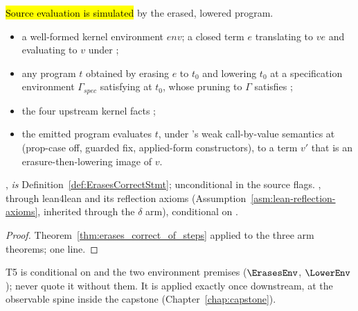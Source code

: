 \begin{theorem}
\label{thm:erases_correct}
\leanok
{}
 \hl{Source evaluation is simulated} by the erased, lowered \lbox{} program.
\begin{itemize}
\item {} a well-formed kernel environment $env$; a closed term $e$ translating to $ve$ and
evaluating to $v$ under \SEval{};
\item any \lbox{} program $t$ obtained by erasing $e$ to $t_0$ and lowering $t_0$ at a specification
environment $\Gamma_{spec}$ satisfying \ErasesEnv{} at $t_0$, whose pruning to $\Gamma$ satisfies
\LowerEnv{};
\item the four upstream kernel facts ;
\item {} the emitted program evaluates $t$, under \lbox{}'s weak call-by-value semantics at
 (prop-case off, guarded fix, applied-form constructors), to a term $v'$ that is an
erasure-then-lowering image of $v$.
\end{itemize}
 , \emph{is} Definition~\ref{def:ErasesCorrectStmt}; unconditional in
the source flags.
 \stProved{}, \stInherited{} through lean4lean and its reflection axioms
(Assumption~\ref{asm:lean-reflection-axioms}, inherited through the $\delta$ arm), conditional on
\stAssumed{} .
\end{theorem}
\begin{proof}
\leanok
{}
 Theorem~\ref{thm:erases_correct_of_steps} applied to the three arm theorems; one line.
\end{proof}

\begin{remark}
 T5 is conditional on  and the two environment premises ($\ErasesEnv$,
$\LowerEnv$); never quote it without them. It is applied exactly once downstream, at the observable spine
inside the capstone (Chapter~\ref{chap:capstone}).
\end{remark}

